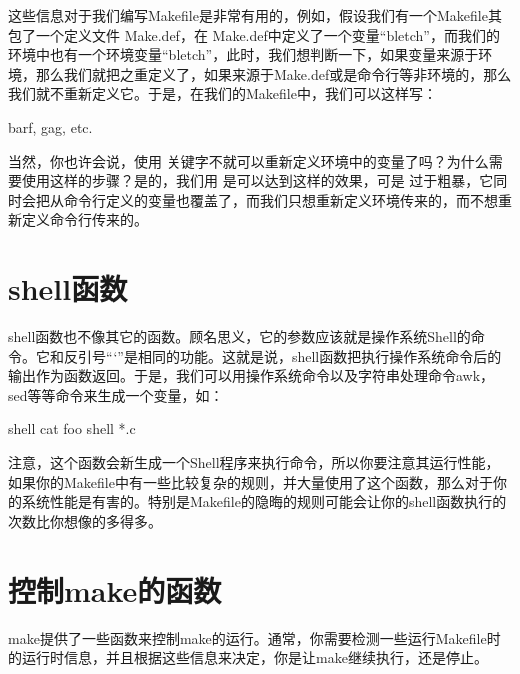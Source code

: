 \documentclass[a4paper,10pt]{sphinxmanual}
\begin{document}
这些信息对于我们编写Makefile是非常有用的，例如，假设我们有一个Makefile其包了一个定义文件
Make.def，在 Make.def中定义了一个变量“bletch”，而我们的环境中也有一个环境变量“bletch”，此时，我们想判断一下，如果变量来源于环境，那么我们就把之重定义了，如果来源于Make.def或是命令行等非环境的，那么我们就不重新定义它。于是，在我们的Makefile中，我们可以这样写：

\begin{sphinxVerbatim}[commandchars=\\\{\}]
          barf, gag, etc.
\end{sphinxVerbatim}

当然，你也许会说，使用  关键字不就可以重新定义环境中的变量了吗？为什么需要使用这样的步骤？是的，我们用  是可以达到这样的效果，可是  过于粗暴，它同时会把从命令行定义的变量也覆盖了，而我们只想重新定义环境传来的，而不想重新定义命令行传来的。


\section{shell函数}
\label{\detokenize{functions:shell}}
shell函数也不像其它的函数。顾名思义，它的参数应该就是操作系统Shell的命令。它和反引号“{}`”是相同的功能。这就是说，shell函数把执行操作系统命令后的输出作为函数返回。于是，我们可以用操作系统命令以及字符串处理命令awk，sed等等命令来生成一个变量，如：

\begin{sphinxVerbatim}[commandchars=\\\{\}]
  shell cat foo
  shell  *.c
\end{sphinxVerbatim}

注意，这个函数会新生成一个Shell程序来执行命令，所以你要注意其运行性能，如果你的Makefile中有一些比较复杂的规则，并大量使用了这个函数，那么对于你的系统性能是有害的。特别是Makefile的隐晦的规则可能会让你的shell函数执行的次数比你想像的多得多。


\section{控制make的函数}
\label{\detokenize{functions:make}}
make提供了一些函数来控制make的运行。通常，你需要检测一些运行Makefile时的运行时信息，并且根据这些信息来决定，你是让make继续执行，还是停止。
\end{document}

